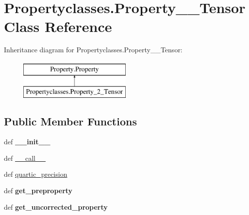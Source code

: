 \hypertarget{classPropertyclasses_1_1Property__2__Tensor}{\section{Propertyclasses.\+Property\+\_\+\_\+\+Tensor Class Reference}
\label{classPropertyclasses_1_1Property__2__Tensor}
}
Inheritance diagram for Propertyclasses.\+Property\+\_\+\_\+\+Tensor\+:\begin{figure}[H]
\begin{center}
\leavevmode
\includegraphics[height=2.000000cm]{classPropertyclasses_1_1Property__2__Tensor}
\end{center}
\end{figure}
\subsection*{Public Member Functions}
\begin{DoxyCompactItemize}
\item 
\hypertarget{classPropertyclasses_1_1Property__2__Tensor_af30d139fb36dd3f01e1751d114725e9b}{def {\bfseries \+\_\+\+\_\+init\+\_\+\+\_\+}}\label{classPropertyclasses_1_1Property__2__Tensor_af30d139fb36dd3f01e1751d114725e9b}

\item 
def \hyperlink{classPropertyclasses_1_1Property__2__Tensor_aef41af532b842a4fc2934b59e32a9b84}{\+\_\+\+\_\+call\+\_\+\+\_\+}
\item 
def \hyperlink{classPropertyclasses_1_1Property__2__Tensor_a10ce8d9ff17db524b67c598bb819c736}{quartic\+\_\+precision}
\item 
\hypertarget{classPropertyclasses_1_1Property__2__Tensor_a280a26f97a795439c8f6ea3653f4184c}{def {\bfseries get\+\_\+preproperty}}\label{classPropertyclasses_1_1Property__2__Tensor_a280a26f97a795439c8f6ea3653f4184c}

\item 
\hypertarget{classPropertyclasses_1_1Property__2__Tensor_a06b01f2819e58ebd13c9e428d846b016}{def {\bfseries get\+\_\+uncorrected\+\_\+property}}\label{classPropertyclasses_1_1Property__2__Tensor_a06b01f2819e58ebd13c9e428d846b016}

\end{DoxyCompactItemize}

